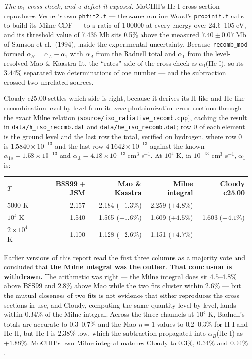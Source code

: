 \documentclass[11pt]{my_memo}
\begin{document}
\emph{The $\alpha_1$ cross-check, and a defect it exposed.}  MoCHII's He I cross section reproduces Verner's own \texttt{phfit2.f} --- the same routine Wood's \texttt{probinit.f} calls to build its Milne CDF --- to a ratio of 1.00000 at every energy over 24.6--105 eV, and its threshold value of 7.436 Mb sits 0.5\% above the measured $7.40\pm0.07$ Mb of Samson et al.\ (1994), inside the experimental uncertainty.  Because \texttt{recomb\_mod} formed $\alpha_B=\alpha_A-\alpha_1$ with $\alpha_A$ from the Badnell total and $\alpha_1$ from the level-resolved Mao \& Kaastra fit, the ``rates'' side of the cross-check \emph{is} $\alpha_1$(He I), so its $3.44\%$ separated two determinations of one number --- and the subtraction crossed two unrelated sources.

Cloudy c25.00 settles which side is right, because it derives its H-like and He-like recombination level by level from its \emph{own} photoionization cross sections through the exact Milne relation (\texttt{source/iso\_radiative\_recomb.cpp}), caching the result in \texttt{data/h\_iso\_recomb.dat} and \texttt{data/he\_iso\_recomb.dat}; row 0 of each element is the ground level and the last row the total, verified on hydrogen, where row 0 is $1.5840\times10^{-13}$ and the last row $4.1642\times10^{-13}$ against the known $\alpha_{1s}=1.58\times10^{-13}$ and $\alpha_A=4.18\times10^{-13}$ cm$^3$ s$^{-1}$.  At $10^4$ K, in $10^{-13}$ cm$^3$ s$^{-1}$, $\alpha_1$ is:

\begin{center}\small
\begin{tabular}{@{}lrrrr@{}}\toprule
$T$&BSS99 $+$ JSM&Mao \& Kaastra&Milne integral&Cloudy c25.00\\\midrule
5000 K&2.157&2.184 ($+1.3\%$)&2.259 ($+4.8\%$)&---\\
$10^4$ K&1.540&1.565 ($+1.6\%$)&1.609 ($+4.5\%$)&1.603 ($+4.1\%$)\\
$2\times10^4$ K&1.100&1.128 ($+2.6\%$)&1.151 ($+4.7\%$)&---\\\bottomrule
\end{tabular}
\end{center}

Earlier versions of this report read the first three columns as a majority vote and concluded that \textbf{the Milne integral was the outlier}.  \textbf{That conclusion is withdrawn.}  The arithmetic was right --- the Milne integral does sit $4.5$--$4.8\%$ above BSS99 and $2.8\%$ above Mao while the two fits cluster within $2.6\%$ --- but the mutual closeness of two fits is not evidence that either reproduces the cross sections in use, and Cloudy, computing the same quantity level by level, lands within $0.34\%$ of the Milne integral.  Across the three channels at $10^4$ K, Badnell's totals are accurate to $0.3$--$0.7\%$ and the Mao $n=1$ values to $0.2$--$0.3\%$ for H I and He II, but He I is $2.38\%$ low, which the subtraction propagated into $\alpha_B$(He I) as $+1.88\%$.  MoCHII's own Milne integral matches Cloudy to $0.3\%$, $0.34\%$ and $0.04\%$.
\end{document}
